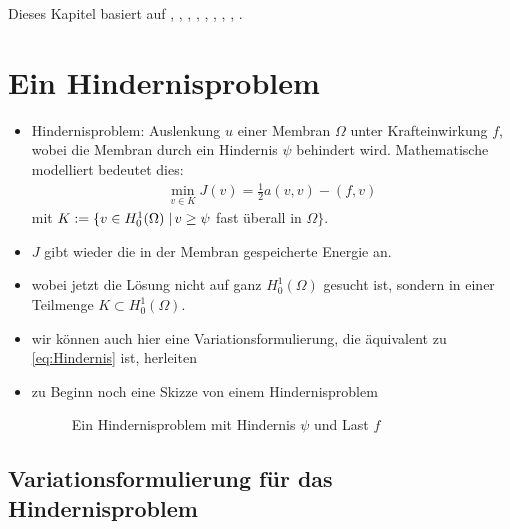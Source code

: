 \label{kap:3}

Dieses Kapitel basiert auf \cite{KikOden}, \cite{StarkeVar}, \cite{EPS}, \cite{EPSContact}, \cite{WriggersFEM}, \cite{WriggersContact}, \cite{HlaHas}, \cite{Glow}, \cite{Falk}.

\section{Ein Hindernisproblem}
\label{kap:3.1}

\begin{itemize}
\item Hindernisproblem: Auslenkung $u$ einer Membran $\Omega$ unter Krafteinwirkung $f$, wobei die Membran durch ein Hindernis $\psi$ behindert wird. Mathematische modelliert bedeutet dies:
\begin{align}\label{eq:Hindernis}
\min_{v\in K} J(v) = \frac 1 2 a(v,v)-(f,v)
\end{align}
mit $K := \{v \in H^1_0(\Omega) \;\vert\, v\ge \psi$ fast überall in $\Omega\}$. 

\item $J$ gibt wieder die in der Membran gespeicherte Energie an.
\item wobei jetzt die Lösung nicht auf ganz $H^1_0(\Omega)$ gesucht ist, sondern in einer Teilmenge $K \subset H^1_0(\Omega)$.

\item wir können auch hier eine Variationsformulierung, die äquivalent zu \eqref{eq:Hindernis} ist, herleiten

\item zu Beginn noch eine Skizze von einem Hindernisproblem

\begin{figure}[h]
\caption{Ein Hindernisproblem mit Hindernis $\psi$ und Last $f$}
\end{figure}

\end{itemize}





\subsection{Variationsformulierung für das Hindernisproblem}
\label{kap:3.1.1}

